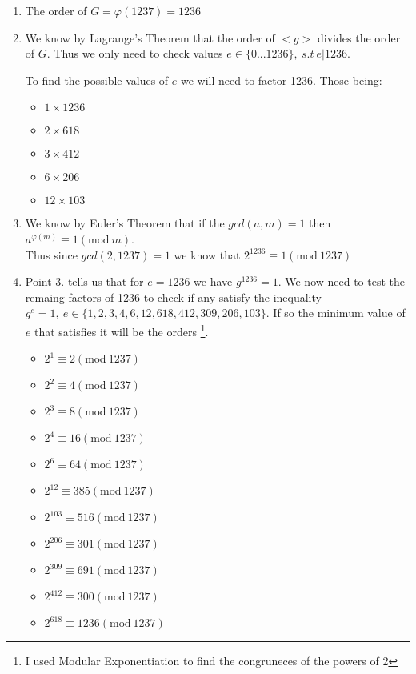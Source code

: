 \documentclass{article}
\numberwithin{equation}{subsection}
\begin{document}
		
	\begin{enumerate}
		\item The order of $G = \varphi(1237) = 1236$
		\item We know by Lagrange's Theorem that the order of $<g>$ divides the order of $G$. Thus we only need to check
			values $e \in \{0...1236\}, \ s.t \ e | 1236$.
			\begin{adjustwidth}{2em}{1em}
				To find the possible values of $e$ we will need to factor 1236. Those being:
				\begin{itemize}
					\item $ 1\times 1236$
					\item $ 2\times 618$
					\item $ 3\times 412$
					\item $ 6\times 206$
					\item $ 12\times 103$
				\end{itemize}
			\end{adjustwidth}

		\item We know by Euler's Theorem that if the $gcd(a,m)=1$ then $a^{\varphi(m)}\equiv 1 (\textrm{mod}\ m)$. 
		\\Thus since $gcd(2,1237) =1$ we know that $2^{1236} \equiv 1(\textrm{mod}\ 1237)$
	
	\item Point 3. tells us that for $e=1236$ we have $g^{1236} = 1$. We now need to test the remaing factors of 1236 to check if
			any satisfy the inequality $g^e=1, \ e\in \{1,2,3,4,6,12,618,412,309,206,103\}$. If so the minimum value of $e$ that satisfies it 
			will be the orders \footnote{I used Modular Exponentiation to find the congruneces of the powers of 2}.

			\begin{adjustwidth}{2em}{1em}
				\begin{itemize}
					\item $2^1 \equiv 2(\textrm{mod}\ 1237)$ 
					\item $2^2 \equiv 4(\textrm{mod}\ 1237)$ 
					\item $2^3 \equiv 8(\textrm{mod}\ 1237)$ 
					\item $2^4 \equiv 16(\textrm{mod}\ 1237)$ 
					\item $2^6 \equiv 64(\textrm{mod}\ 1237)$ 
					\item $2^{12} \equiv 385(\textrm{mod}\ 1237)$ 
					\item $2^{103} \equiv 516(\textrm{mod}\ 1237)$ 
					\item $2^{206} \equiv 301(\textrm{mod}\ 1237)$ 
					\item $2^{309} \equiv 691(\textrm{mod}\ 1237)$ 
					\item $2^{412} \equiv 300(\textrm{mod}\ 1237)$ 
					\item $2^{618} \equiv 1236(\textrm{mod}\ 1237)$ 
				\end{itemize}
			\end{adjustwidth}
\end{enumerate}
\end{document}
